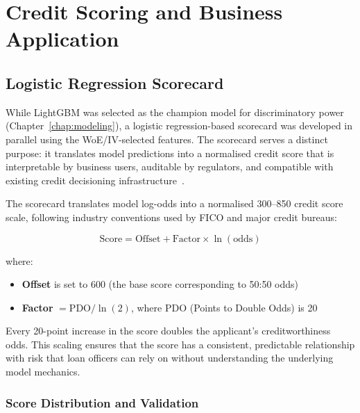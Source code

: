 \chapter{Credit Scoring and Business Application}
\label{chap:scoring}

\section{Logistic Regression Scorecard}
\label{sec:scorecard}

While LightGBM was selected as the champion model for discriminatory power (Chapter~\ref{chap:modeling}), a logistic regression-based scorecard was developed in parallel using the WoE/IV-selected features. The scorecard serves a distinct purpose: it translates model predictions into a normalised credit score that is interpretable by business users, auditable by regulators, and compatible with existing credit decisioning infrastructure~\cite{siddiqi2012}.

The scorecard translates model log-odds into a normalised 300--850 credit score scale, following industry conventions used by \ac{FICO} and major credit bureaus:

\begin{equation}
\text{Score} = \text{Offset} + \text{Factor} \times \ln(\text{odds})
\label{eq:scorecard}
\end{equation}

where:
\begin{itemize}
    \item \textbf{Offset} is set to 600 (the base score corresponding to 50:50 odds)
    \item \textbf{Factor} $= \text{PDO} / \ln(2)$, where PDO (Points to Double Odds) is 20
\end{itemize}

Every 20-point increase in the score doubles the applicant's creditworthiness odds. This scaling ensures that the score has a consistent, predictable relationship with risk that loan officers can rely on without understanding the underlying model mechanics.

\subsection{Score Distribution and Validation}



